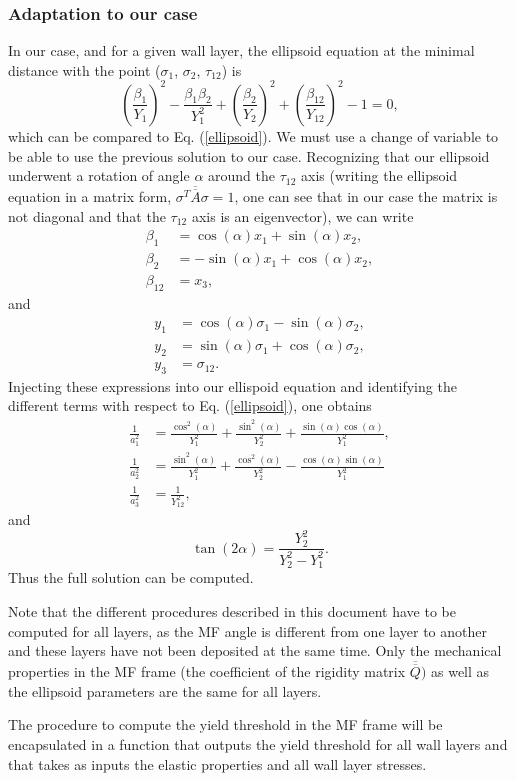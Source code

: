\documentclass[]{article}
\begin{document}
\subsubsection{Adaptation to our case}
In our case, and for a given wall layer, the ellipsoid equation at the minimal distance with the point ($\sigma_1$, $\sigma_2$, $\tau_{12}$) is
\begin{equation}
		\left(\frac{\beta_1}{Y_1}\right)^2 - \frac{\beta_1 \beta_2}{Y_1^2} + \left(\frac{\beta_2}{Y_2}\right)^2 + \left(\frac{\beta_{12}}{Y_{12}}\right)^2 -1=0,
\end{equation}
which can be compared to Eq. (\ref{ellipsoid}).
We must use a change of variable to be able to use the previous solution to our case. Recognizing that our ellipsoid underwent a rotation of angle $\alpha$ around the $\tau_{12}$ axis (writing the ellipsoid equation in a matrix form, $\sigma^T\overline{\overline{A}}\sigma=1$, one can see that in our case the matrix is not diagonal and that the $\tau_{12}$ axis is an eigenvector), we can write
\begin{align}
	\beta_1 &= \cos(\alpha) x_1 + \sin({\alpha}) x_2, \nonumber \\
	\beta_2 &= -\sin(\alpha) x_1 + \cos(\alpha) x_2,  \\
	\beta_{12} &= x_3, \nonumber 
\end{align}
and
\begin{align}
	y_1 &= \cos(\alpha) \sigma_1 - \sin({\alpha}) \sigma_2, \nonumber \\
	y_2 &= \sin(\alpha) \sigma_1 + \cos(\alpha) \sigma_2,  \\
	y_3 &= \sigma_{12}. \nonumber 
\end{align}
Injecting these expressions into our ellispoid equation and identifying the different terms with respect to Eq. (\ref{ellipsoid}), one obtains
\begin{align}
	\frac{1}{a_1^2} &= \frac{\cos^2(\alpha)}{Y_1^2} + \frac{\sin^2(\alpha)}{Y_2^2}+\frac{\sin(\alpha)\cos(\alpha)}{Y_1^2}, \nonumber \\
	\frac{1}{a_2^2} &= \frac{\sin^2(\alpha)}{Y_1^2} + \frac{\cos^2(\alpha)}{Y_2^2}-\frac{\cos(\alpha)\sin(\alpha)}{Y_1^2} \\
	\frac{1}{a_3^2} &= \frac{1}{Y_{12}^2}, \nonumber 
\end{align}
and
\begin{equation}
	\tan(2\alpha)=\frac{Y_2^2}{Y_2^2-Y_1^2}.
\end{equation}
Thus the full solution can be computed.

Note that the different procedures described in this document have to be computed for all layers, as the MF angle is different from one layer to another and these layers have not been deposited at the same time. Only the mechanical properties in the MF frame (the coefficient of the rigidity matrix $\overline{\overline{Q}})$ as well as  the ellipsoid parameters are the same for all layers. 

The procedure to compute the yield threshold in the MF frame will be encapsulated in a function that outputs the yield threshold for all wall layers and that takes as inputs the elastic properties and all wall layer stresses.

\end{document}
